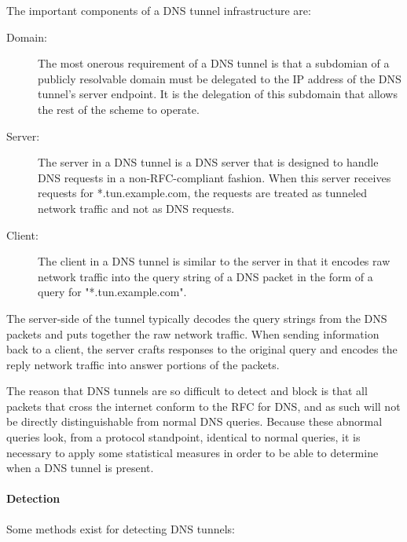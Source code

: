 \documentclass{article}
\theoremstyle{remark}
\theoremstyle{definition}
\theoremstyle{definition}
\theoremstyle{definition}
\begin{document}
The important components of a DNS tunnel infrastructure are:

\begin{description}
\item[Domain:] The most onerous requirement of a DNS tunnel is that a subdomian of a publicly resolvable domain must be delegated to the IP address of the DNS tunnel's server endpoint. It is the delegation of this subdomain that allows the rest of the scheme to operate.
\item[Server:] The server in a DNS tunnel is a DNS server that is designed to handle DNS requests in a non-RFC-compliant fashion. When this server receives requests for *.tun.example.com, the requests are treated as tunneled network traffic and not as DNS requests.
\item[Client:] The client in a DNS tunnel is similar to the server in that it encodes raw network traffic into the query string of a DNS packet in the form of a query for "*.tun.example.com".
\end{description}

The server-side of the tunnel typically decodes the query strings from the DNS packets and puts together the raw network traffic. When sending information back to a client, the server crafts responses to the original query and encodes the reply network traffic into answer portions of the packets.

The reason that DNS tunnels are so difficult to detect and block is that all packets that cross the internet conform to the RFC for DNS, and as such will not be directly distinguishable from normal DNS queries. Because these abnormal queries look, from a protocol standpoint, identical to normal queries, it is necessary to apply some statistical measures in order to be able to determine when a DNS tunnel is present.

\paragraph{Detection}

Some methods exist for detecting DNS tunnels:
\end{document}
